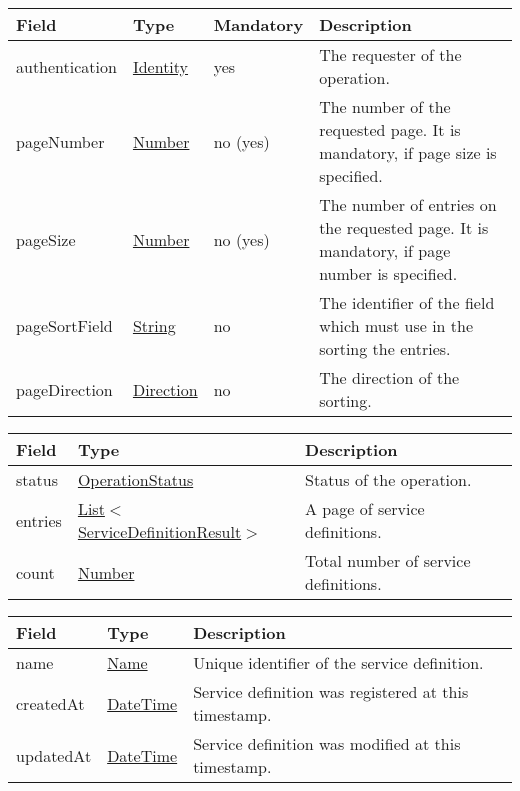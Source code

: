 \documentclass[a4paper]{arrowhead}
\newcommand{\pref}[1]{{\textcolor{ArrowheadGrey}{\hyperref[sec:model:primitives:#1]{#1}}}}
\begin{document}
\label{sec:model:PageRequest}

\begin{table}[ht!]
\begin{tabularx}{\textwidth}{| p{4.1cm} | p{3cm} | p{2cm} | X |} \hline
\rowcolor{gray!33} Field & Type & Mandatory & Description \\ \hline
authentication & \hyperref[sec:model:Identity]{Identity} & yes & The requester of the operation. \\ \hline
pageNumber & \pref{Number} & no (yes) & The number of the requested page. It is mandatory, if page size is specified. \\ \hline
pageSize & \pref{Number} & no (yes) & The number of entries on the requested page. It is mandatory, if page number is specified. \\ \hline
pageSortField & \pref{String} & no & The identifier of the field which must use in the sorting the entries. \\ \hline
pageDirection & \pref{Direction} & no & The direction of the sorting. \\ \hline
\end{tabularx}
\end{table}

\label{sec:model:ServiceDefinitionListResponse}

\begin{table}[ht!]
\begin{tabularx}{\textwidth}{| p{3cm} | p{6cm} | X |} \hline
\rowcolor{gray!33} Field & Type      & Description \\ \hline
status & \pref{OperationStatus} & Status of the operation. \\ \hline
entries & \pref{List}$<$\hyperref[sec:model:ServiceDefinitionResult]{ServiceDefinitionResult}$>$ & A page of service definitions. \\ \hline
count & \pref{Number} & Total number of service definitions. \\ \hline
\end{tabularx}
\end{table}

\label{sec:model:ServiceDefinitionResult}
 
\begin{table}[ht!]
\begin{tabularx}{\textwidth}{| p{4.25cm} | p{4cm} | X |} \hline
\rowcolor{gray!33} Field & Type      & Description \\ \hline
name & \pref{Name} & Unique identifier of the service definition. \\ \hline
createdAt & \pref{DateTime} & Service definition was registered at this timestamp. \\ \hline
updatedAt & \pref{DateTime} & Service definition was modified at this timestamp. \\ \hline
\end{tabularx}
\end{table}
\end{document}
